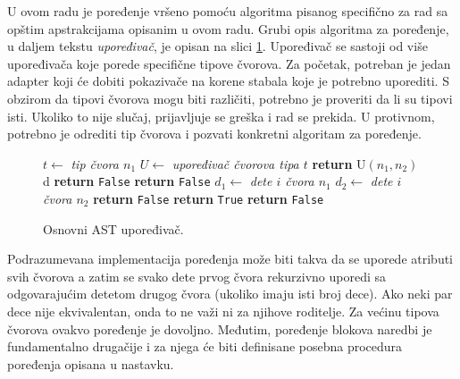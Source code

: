 U ovom radu je poređenje vršeno pomoću algoritma pisanog specifično za rad sa opštim apstrakcijama opisanim u ovom radu. Grubi opis algoritma za poređenje, u daljem tekstu \emph{upoređivač}, je opisan na slici \ref{fig:ComparisonAlgorithmPseudo}. Upoređivač se sastoji od više upoređivača koje porede specifične tipove čvorova. Za početak, potreban je jedan adapter koji će dobiti pokazivače na korene stabala koje je potrebno uporediti. S obzirom da tipovi čvorova mogu biti različiti, potrebno je proveriti da li su tipovi isti. Ukoliko to nije slučaj, prijavljuje se greška i rad se prekida. U protivnom, potrebno je odrediti tip čvorova i pozvati konkretni algoritam za poređenje. 

\begin{figure}[!h]
\begin{algorithmic}[1]
    \State $t \gets$ \emph{tip čvora $n_1$}
        \State $U \gets$ \emph{upoređivač čvorova tipa $t$}
        \State \textbf{return} U$(n_1, n_2)$
    \Else
        d
            \State \textbf{return} \texttt{False}
        \Else        
                \State \textbf{return} \texttt{False}
            \EndIf
                \State $d_1 \gets $ \emph{dete $i$ čvora $n_1$}
                \State $d_2 \gets $ \emph{dete $i$ čvora $n_2$}
                    \State \textbf{return} \texttt{False}
                \EndIf
            \EndFor
            \State \textbf{return} \texttt{True}
        \EndIf
    \EndIf
\Else
    \State \textbf{return} \texttt{False}
\EndIf
\EndProcedure
\end{algorithmic}
\caption{Osnovni AST upoređivač.}
\label{fig:ComparisonAlgorithmPseudo}
\end{figure}

Podrazumevana implementacija poređenja može biti takva da se uporede atributi svih čvorova a zatim se svako dete prvog čvora rekurzivno uporedi sa odgovarajućim detetom drugog čvora (ukoliko imaju isti broj dece). Ako neki par dece nije ekvivalentan, onda to ne važi ni za njihove roditelje. Za većinu tipova čvorova ovakvo poređenje je dovoljno. Međutim, poređenje blokova naredbi je fundamentalno drugačije i za njega će biti definisane posebna procedura poređenja opisana u nastavku.


